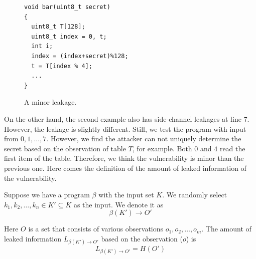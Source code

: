 \begin{figure}[h]
  \begin{minipage}{0.60\linewidth}
    \begin{lstlisting}[xleftmargin=.15\textwidth,xrightmargin=.30\textwidth]
void bar(uint8_t secret)
{
  uint8_t T[128];
  uint8_t index = 0, t;
  int i;
  index = (index+secret)%128;
  t = T[index % 4];
  ...
}
\end{lstlisting}
  \end{minipage}
  \hfill
  \begin{minipage}{0.4\linewidth}
  \end{minipage}
  \caption{A minor leakage. }\label{chapter5:fig:example2}
\end{figure}
On the other hand, the second example also has side-channel leakages at line 7. However, the leakage is slightly different. Still, we test the program with input from $0, 1, \dots, 7$. However, we find the attacker can not uniquely determine the secret based on the observation of table $T$, for example. Both $0$ and $4$ read the first item of the table. Therefore, we think the vulnerability is minor than the previous one. Here comes the definition of the amount of leaked information of the vulnerability.


\begin{mydef}
  \label{chapter5:def}
  Suppose we have a program $\beta$ with the input set $K$. We randomly select $k_1, k_2, \dots, k_n \in K' \subseteq K$ as the input. We denote it as
  $$\beta(K') \rightarrow	O'$$

  Here $O$ is a set that consists of various observations $o_1, o_2, \dots, o_m$. The amount of leaked information $L_{\beta(K')\rightarrow O'}$ based on the observation ($o$) is
  $$L_{\beta(K')\rightarrow O'} = H(O') $$
\end{mydef}


